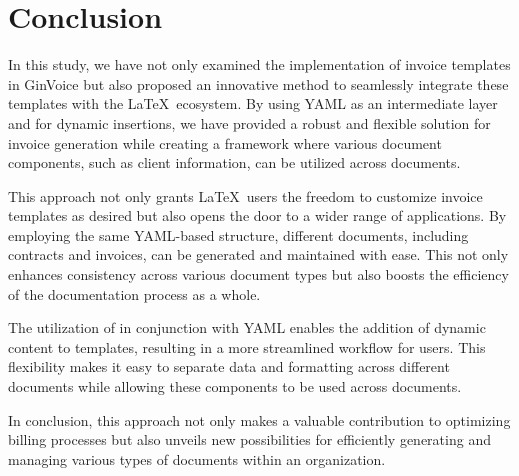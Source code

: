 \section{Conclusion}\label{sec:conclusion}
In this study, we have not only examined the implementation of invoice templates in GinVoice but also proposed an innovative method to seamlessly integrate these templates with the \LaTeX\ ecosystem.
By using YAML as an intermediate layer and  for dynamic insertions, we have provided a robust and flexible solution for invoice generation while creating a framework where various document components, such as client information, can be utilized across documents.

This approach not only grants \LaTeX\ users the freedom to customize invoice templates as desired but also opens the door to a wider range of applications.
By employing the same YAML-based structure, different documents, including contracts and invoices, can be generated and maintained with ease.
This not only enhances consistency across various document types but also boosts the efficiency of the documentation process as a whole.

The utilization of  in conjunction with YAML enables the addition of dynamic content to templates, resulting in a more streamlined workflow for users.
This flexibility makes it easy to separate data and formatting across different documents while allowing these components to be used across documents.

In conclusion, this approach not only makes a valuable contribution to optimizing billing processes but also unveils new possibilities for efficiently generating and managing various types of documents within an organization.
